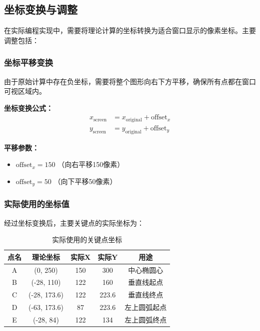 \documentclass[12pt,a4paper]{article}
\begin{document}
\subsection{坐标变换与调整}

在实际编程实现中，需要将理论计算的坐标转换为适合窗口显示的像素坐标。主要调整包括：

\subsubsection{坐标平移变换}

由于原始计算中存在负坐标，需要将整个图形向右下方平移，确保所有点都在窗口可视区域内。

\begin{tcolorbox}
\textbf{坐标变换公式：}
\begin{align}
x_{\text{screen}} &= x_{\text{original}} + \text{offset}_x \\
y_{\text{screen}} &= y_{\text{original}} + \text{offset}_y
\end{align}

\textbf{平移参数：}
\begin{itemize}
    \item $\text{offset}_x = 150$ （向右平移150像素）
    \item $\text{offset}_y = 50$ （向下平移50像素）
\end{itemize}
\end{tcolorbox}

\subsubsection{实际使用的坐标值}

经过坐标变换后，主要关键点的实际坐标为：

\begin{table}[H]
\centering
\caption{实际使用的关键点坐标}
\begin{tabular}{|c|c|c|c|c|}
\hline
\textbf{点名} & \textbf{理论坐标} & \textbf{实际X} & \textbf{实际Y} & \textbf{用途} \\
\hline
A & (0, 250) & 150 & 300 & 中心椭圆心 \\
\hline
B & (-28, 110) & 122 & 160 & 垂直线起点 \\
\hline
C & (-28, 173.6) & 122 & 223.6 & 垂直线终点 \\
\hline
D & (-63, 173.6) & 87 & 223.6 & 左上圆弧起点 \\
\hline
E & (-28, 84) & 122 & 134 & 左上圆弧终点 \\
\hline
\end{tabular}
\end{table}
\end{document}
